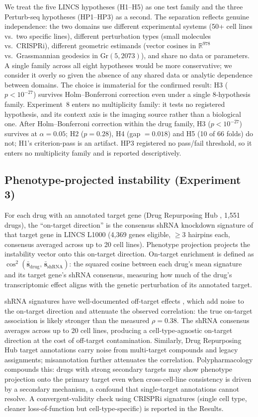 \documentclass[11pt]{article}
\begin{document}
We treat the five LINCS hypotheses (H1--H5) as one test family and the
three Perturb-seq hypotheses (HP1--HP3) as a second. The separation
reflects genuine independence: the two domains use different experimental
systems (50+ cell lines vs.\ two specific lines), different perturbation types
(small molecules vs.\ CRISPRi), different geometric estimands (vector
cosines in $\mathbb{R}^{978}$ vs.\ Grassmannian geodesics in Gr$(5, 2073)$),
and share no data or parameters. A single family across all eight hypotheses
would be more conservative; we consider it overly so given the absence of
any shared data or analytic dependence between domains. The choice is
immaterial for the confirmed result: H3 ($p < 10^{-27}$) survives
Holm--Bonferroni correction even under a single 8-hypothesis family. Experiment~8
enters no multiplicity family: it tests no registered hypothesis, and its
context axis is the imaging source rather than a biological one. After Holm--Bonferroni
correction within the drug family, H3 ($p < 10^{-27}$) survives at
$\alpha = 0.05$; H2 ($p = 0.28$), H4 (gap $= 0.018$) and H5 (10 of 66
folds) do not;
H1's criterion-pass is an artifact.
HP3 registered no pass/fail threshold, so it enters no multiplicity
family and is reported descriptively.

\subsection{Phenotype-projected instability (Experiment 3)}

For each drug with an annotated target gene (Drug Repurposing Hub
\citep{corsello2017drug}, 1{,}551 drugs), the ``on-target direction'' is the consensus shRNA
knockdown signature of that target gene in LINCS L1000 (4{,}369 genes
eligible, $\geq$3 hairpins each, consensus averaged across up to 20 cell lines).
Phenotype projection projects the instability vector onto this
on-target direction. On-target enrichment is defined as $\cos^2(\bar{\mathbf{s}}_{\text{drug}},\,
\bar{\mathbf{s}}_{\text{shRNA}})$: the squared cosine between each drug's
mean signature and its target gene's shRNA consensus, measuring how much
of the drug's transcriptomic effect aligns with the genetic perturbation of
its annotated target.

shRNA signatures have well-documented off-target effects
\citep{smith2017evaluation}, which add noise to the on-target direction
and attenuate the observed correlation: the true on-target association is
likely stronger than the measured $\rho = 0.38$.
The shRNA consensus averages across up to 20 cell lines, producing a
cell-type-agnostic on-target direction at the cost of off-target
contamination. Similarly, Drug Repurposing Hub target annotations carry
noise from multi-target compounds and legacy assignments; misannotation
further attenuates the correlation. Polypharmacology compounds this:
drugs with strong secondary targets may show phenotype projection onto the
primary target even when cross-cell-line consistency is driven by a
secondary mechanism, a confound that single-target annotations cannot
resolve. A convergent-validity
check using CRISPRi signatures (single cell type, cleaner
loss-of-function but cell-type-specific) is reported in the Results.
\end{document}
